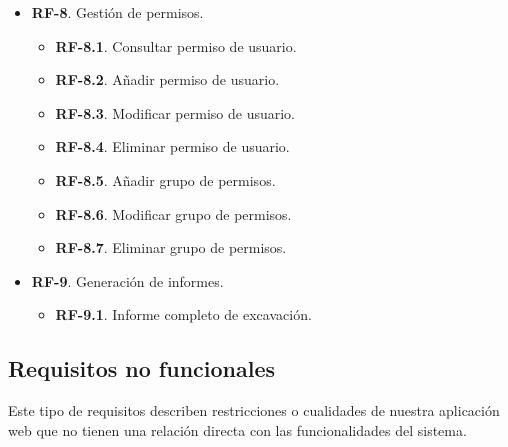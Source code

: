 \begin{itemize}
\begin{itemize}
            \end{itemize}
        \item \textbf{RF-8}. Gestión de permisos.
            \begin{itemize}
                \item \textbf{RF-8.1}. Consultar permiso de usuario.
                \item \textbf{RF-8.2}. Añadir permiso de usuario.
                \item \textbf{RF-8.3}. Modificar permiso de usuario.
                \item \textbf{RF-8.4}. Eliminar permiso de usuario.
                \item \textbf{RF-8.5}. Añadir grupo de permisos.
                \item \textbf{RF-8.6}. Modificar grupo de permisos.
                \item \textbf{RF-8.7}. Eliminar grupo de permisos.
            \end{itemize}
        \item \textbf{RF-9}. Generación de informes.
            \begin{itemize}
                \item \textbf{RF-9.1}. Informe completo de excavación.
            \end{itemize}
    \end{itemize}

\subsection{Requisitos no funcionales}
Este tipo de requisitos describen restricciones o cualidades de nuestra aplicación web que
no tienen una relación directa con las funcionalidades del sistema.

